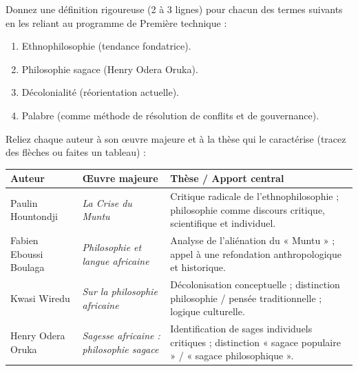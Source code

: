 \documentclass[11pt]{article}
\newcommand{\cle}[1]{{\popxbold\color{popdark}#1}}
\newcounter{popsec}
\newcounter{popsub}
\newcommand{\courssub}[1]{%
  \stepcounter{popsub}%
  \par\vspace{9pt}\noindent{\popxbold\fontsize{11.5}{13}\selectfont\color{popink}{\color{poporange}\thepopsec.\thepopsub}\hspace{6pt}#1}\par\nopagebreak\vspace{4pt}
}
\begin{document}
\begin{exercice}
Donnez une définition rigoureuse (2 à 3 lignes) pour chacun des termes suivants en les reliant au programme de Première technique :
\begin{enumerate}
    \item \cle{Ethnophilosophie} (tendance fondatrice).
    \item \cle{Philosophie sagace} (Henry Odera Oruka).
    \item \cle{Décolonialité} (réorientation actuelle).
    \item \cle{Palabre} (comme méthode de résolution de conflits et de gouvernance).
\end{enumerate}
\end{exercice}

\begin{exercice}
Reliez chaque auteur à son œuvre majeure et à la thèse qui le caractérise (tracez des flèches ou faites un tableau) :
\begin{center}
\begin{tabularx}{\linewidth}{|X|X|X|}\hline
\textbf{Auteur} & \textbf{Œuvre majeure} & \textbf{Thèse / Apport central} \\ \hline
Paulin Hountondji & \emph{La Crise du Muntu} & Critique radicale de l'ethnophilosophie ; philosophie comme discours critique, scientifique et individuel. \\ \hline
Fabien Eboussi Boulaga & \emph{Philosophie et langue africaine} & Analyse de l'aliénation du « Muntu » ; appel à une refondation anthropologique et historique. \\ \hline
Kwasi Wiredu & \emph{Sur la philosophie africaine} & Décolonisation conceptuelle ; distinction philosophie / pensée traditionnelle ; logique culturelle. \\ \hline
Henry Odera Oruka & \emph{Sagesse africaine : philosophie sagace} & Identification de sages individuels critiques ; distinction « sagace populaire » / « sagace philosophique ». \\ \hline
\end{tabularx}
\end{center}
\end{exercice}

\courssub{Je m'entraîne}
\end{document}

